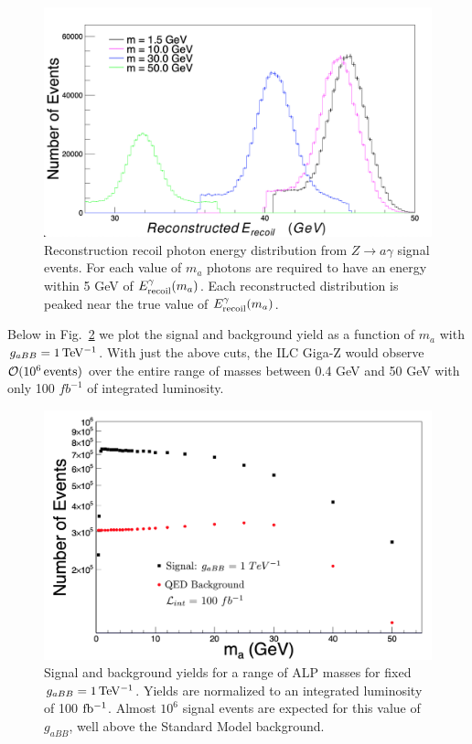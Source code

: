 \documentclass[aps,onecolumn,twoside,secnumarabic,12pt,balancelastpage,amsmath,amssymb,nofootinbib,hyperref=pdftex]{revtex4}
\begin{document}
\begin{figure}[t]
\begin{center}
\includegraphics[width=12cm]{recoil_energy.png}
\caption{Reconstruction recoil photon energy distribution from $Z\rightarrow a\gamma$ signal events. For each value of $m_{a}$ photons are required to have an energy within 5 GeV of $E^{\gamma}_{\rm recoil}(m_{a})$. Each reconstructed distribution is peaked near the true value of $E^{\gamma}_{\rm recoil}(m_{a})$.}
\label{fig:recoil_energy}
\end{center}
\end{figure}
Below in Fig.~\ref{fig:yield} we plot the signal and background yield as a function of $m_{a}$ with $g_{aBB} = 1\,\rm{TeV^{-1}}$. With just the above cuts, the ILC Giga-Z would observe $\mathcal{O}(10^{6}\,\rm{events})$ over the entire range of masses between 0.4 GeV and 50 GeV with only 100 $fb^{-1}$ of integrated luminosity.
\begin{figure}[htbp]
\begin{center}
\includegraphics[width=14cm]{Yield2.png}
\caption{Signal and background yields for a range of ALP masses for fixed $g_{aBB} = 1\,\rm{TeV^{-1}}$. Yields are normalized to an integrated luminosity of 100 $\rm fb^{-1}$. Almost $10^{6}$ signal events are expected for this value of $g_{aBB}$, well above the Standard Model background.}
\label{fig:yield}
\end{center}
\end{figure}
\end{document}
